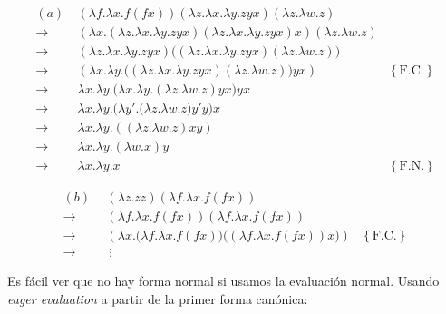 \documentclass[article, 12pt]{article}
\begin{document}
\begin{align*}
  (a) ~ &\left( \lambda f. \lambda x. f (fx)  \right) \left( \lambda z. \lambda x.
   \lambda y. zyx\right) \left( \lambda z. \lambda w. z \right)   \\ 
  \to &\left( \lambda x. \left( \lambda z. \lambda x. \lambda y.
  zyx\right) \left( \lambda z. \lambda x. \lambda y. zyx \right) x   \right)
  \left( \lambda z. \lambda w. z \right) \\ 
      \to&\left( \lambda z. \lambda x. \lambda y. zyx \right) \Big(\left( \lambda z.
  \lambda x. \lambda y. zyx \right) \left( \lambda z. \lambda w. z \right) \Big)
\\ \to & \left( \lambda x. \lambda  y. \Big( \left( \lambda z.\lambda x. \lambda
y. zyx\right)\left( \lambda z. \lambda w. z \right)   \Big) yx \right) &
\left\{ \text{F.C.} \right\} \\ 
\to &\lambda x. \lambda y. \big( \lambda x. \lambda y. \left( \lambda z. \lambda
w. z\right)yx  \big)yx \\ 
    \to &\lambda x. \lambda y. \Big( \lambda y'.\big( \lambda z. \lambda w. z
    \big)y' y \Big) x \\ 
        \to &\lambda x. \lambda y. \left( ( \lambda z. \lambda w. z )xy \right)
        \\ 
\to & \lambda x. \lambda y. (\lambda w. x)y \\ 
\to & \lambda x. \lambda y. x &\left\{ \text{F.N.} \right\} 
\end{align*}

\begin{align*}
  (b) ~ ~ 
&\left( \lambda z. zz \right) \left( \lambda f. \lambda x. f(fx)
  \right)  \\ 
\to &\left( \lambda f. \lambda x. f(fx) \right) \left( \lambda f. \lambda x.
f(fx) \right) \\ 
\to & \left( \lambda x. \Big( \lambda f. \lambda x. f(fx) \Big)\Big( \left(
\lambda f. \lambda x. f(fx) \right)x  \Big) \right) &\left\{ \text{F.C.}
\right\} \\ 
  \to & ~ \vdots
\end{align*}

Es fácil ver que no hay forma normal si usamos la evaluación normal. Usando
\textit{eager evaluation} a partir de la primer forma canónica: 
\end{document}
